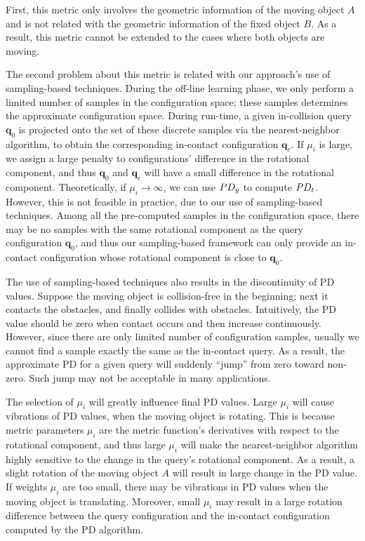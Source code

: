 First, this metric only involves the geometric information of the moving object $A$ and is not related with the geometric information of the fixed object $B$. As a result, this metric cannot be extended to the cases where both objects are moving. 

The second problem about this metric is related with our approach's use of sampling-based techniques. During the off-line learning phase, we only perform a limited number of samples in the configuration space; these samples determines the approximate configuration space. During run-time, a given in-collision query $\mathbf q_0$ is projected onto the set of these discrete samples via the nearest-neighbor algorithm, to obtain the corresponding in-contact configuration $\mathbf q_c$. If $\mu_i$ is large, we assign a large penalty to configurations' difference in the rotational component, and thus $\mathbf q_0$ and $\mathbf q_c$ will have a small difference in the rotational component. Theoretically, if $\mu_i \rightarrow \infty$, we can use $PD_g$ to compute $PD_t$. However, this is not feasible in practice, due to our use of sampling-based techniques. Among all the pre-computed samples in the configuration space, there may be no samples with the same rotational component as the query configuration $\mathbf q_0$, and thus our sampling-based framework can only provide an in-contact configuration whose rotational component is close to $\mathbf q_0$. 

The use of sampling-based techniques also results in the discontinuity of PD values. Suppose the moving object is collision-free in the beginning; next it contacts the obstacles, and finally collides with obstacles. Intuitively, the PD value should be zero when contact occurs and then increase continuously. However, since there are only limited number of configuration samples, usually we cannot find a sample exactly the same as the in-contact query. As a result, the approximate PD for a given query will suddenly ``jump'' from zero toward non-zero. Such jump may not be acceptable in many applications.

The selection of $\mu_i$ will greatly influence final PD values. Large $\mu_i$ will cause vibrations of PD values, when the moving object is rotating. This is because metric parameters $\mu_i$ are the metric function's derivatives with respect to the rotational component, and thus large $\mu_i$ will make the nearest-neighbor algorithm highly sensitive to the change in the query's rotational component. As a result, a slight rotation of the moving object $A$ will result in large change in the PD value. If weights $\mu_i$ are too small, there may be vibrations in PD values when the moving object is translating. Moreover, small $\mu_i$ may result in a large rotation difference between the query configuration and the in-contact configuration computed by the PD algorithm.

